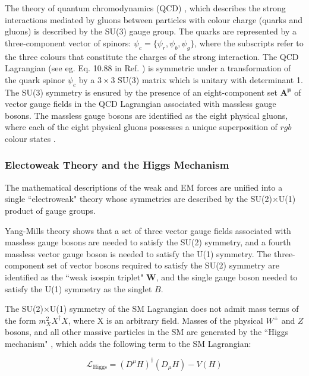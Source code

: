 The theory of quantum chromodynamics (QCD) \cite{qcd_2007}, which describes the strong interactions mediated by gluons between particles with colour charge (quarks and gluons) is described by the SU(3) gauge group. The quarks are represented by a three-component vector of spinors: \(\psi_c = \{\psi_r, \psi_b, \psi_g\}\), where the subscripts refer to the three colours that constitute the charges of the strong interaction. The QCD Lagrangian (see eg. Eq. 10.88 in Ref. \cite{griffiths_2008}) is symmetric under a transformation of the quark spinor \(\psi_c\) by a \(3\times3\) SU(3) matrix which is unitary with determinant 1. The SU(3) symmetry is ensured by the presence of an eight-component set \(\boldsymbol{\boldsymbol{A}^\mu}\) of vector gauge fields in the QCD Lagrangian associated with massless gauge bosons. The massless gauge bosons are identified as the eight physical gluons, where each of the eight physical gluons possesses a unique superposition of \({rgb}\) colour states \cite{griffiths_2008}.

\subsubsection{Electoweak Theory and the Higgs Mechanism}

The mathematical descriptions of the weak and EM forces are unified into a single ``electroweak" \cite{electroweak_2012} theory whose symmetries are described by the SU(2)\(\times\)U(1) product of gauge groups. 

Yang-Mills theory \cite{yang_mills_1954} shows that a set of three vector gauge fields associated with massless gauge bosons are needed to satisfy the SU(2) symmetry, and a fourth massless vector gauge boson is needed to satisfy the U(1) symmetry. The three-component set of vector bosons required to satisfy the SU(2) symmetry are identified as the ``weak isospin triplet" \(\boldsymbol{W}\), and the single gauge boson needed to satisfy the U(1) symmetry as the singlet \(B\). 

The SU(2)\(\times\)U(1) symmetry of the SM Lagrangian does not admit mass terms of the form \(m_X^2X^\dagger X\), where X is an arbitrary field. Masses of the physical \(W^\pm\) and \(Z\) bosons, and all other massive particles in the SM are generated by the ``Higgs mechanism" \cite{HiggsTheory1,HiggsTheory2,HiggsTheory3}, which adds the following term to the SM Lagrangian:

\begin{equation}
\label{eq:higgs_lagrangian}
\mathcal{L}_\text{Higgs} = (D^\mu H)^\dagger(D_\mu H) - V(H)
\end{equation}

